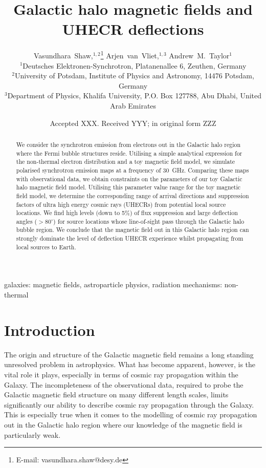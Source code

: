 \documentclass[usenatbib]{mnras}
\title{Galactic halo magnetic fields and UHECR deflections}
\author[V.~Shaw et al.]{
Vasundhara~Shaw,$^{1,2}$\thanks{E-mail: vasundhara.shaw@desy.de}
Arjen~van~Vliet,$^{1,3}$
Andrew~M.~Taylor$^{1}$
\\
$^{1}$Deutsches Elektronen-Synchrotron, Platanenallee 6, Zeuthen, Germany \\ %
$^{2}$University of Potsdam, Institute of Physics and Astronomy, 14476 Potsdam, Germany \\
$^{3}$Department of Physics, Khalifa University, P.O. Box 127788, Abu Dhabi, United Arab Emirates
}
\date{Accepted XXX. Received YYY; in original form ZZZ}
\begin{document}
\maketitle

\begin{abstract}
We consider the synchrotron emission from electrons out in the Galactic halo region where the Fermi bubble structures reside. Utilising a simple analytical expression for the non-thermal electron distribution and a toy magnetic field model, we simulate polarised synchrotron emission maps at a frequency of 30~GHz. Comparing these maps with observational data, we obtain constraints on the parameters of our toy Galactic halo magnetic field model. Utilising this parameter value range for the toy magnetic field model, we determine the corresponding range of arrival directions and suppression factors of ultra high energy cosmic rays (UHECRs) from potential local source locations. We find high levels (down to 5\%) of flux suppression and large deflection angles ($>80^{\circ}$) for source locations whose line-of-sight pass through the Galactic halo bubble region. We conclude that the magnetic field out in this Galactic halo region can strongly dominate the level of deflection UHECR experience whilst propagating from local sources to Earth.
\end{abstract}

\begin{keywords}
galaxies: magnetic fields, astroparticle physics, radiation mechanisms: non-thermal
\end{keywords}


\section{Introduction}
\label{Introducion}

The origin and structure of the Galactic magnetic field remains a long standing unresolved problem in astrophysics. What has become apparent, however, is the vital role it plays, especially in terms of cosmic ray propagation within the Galaxy. The incompleteness of the observational data, required to probe the Galactic magnetic field structure on many different length scales, limits significantly our ability to describe cosmic ray propagation through the Galaxy. This is especially true when it comes to the modelling of cosmic ray propagation out in the Galactic halo region where our knowledge of the magnetic field is particularly weak.
\end{document}
